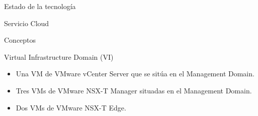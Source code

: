 \begin{chapter}{Estado de la tecnología}
\begin{section}{Servicio Cloud}
\begin{subsection}{Conceptos}
\begin{subsubsection}{Virtual Infrastructure Domain (VI)}
        \begin{itemize}
            \item Una VM de VMware vCenter Server que se sitúa en el Management Domain.
            \item Tres VMs de VMware NSX-T Manager situadas en el Management Domain.
            \item Dos VMs de VMware NSX-T Edge.
          \end{itemize}

         \end{subsubsection}

              
        

\end{subsection}
\end{section}
\end{chapter}
